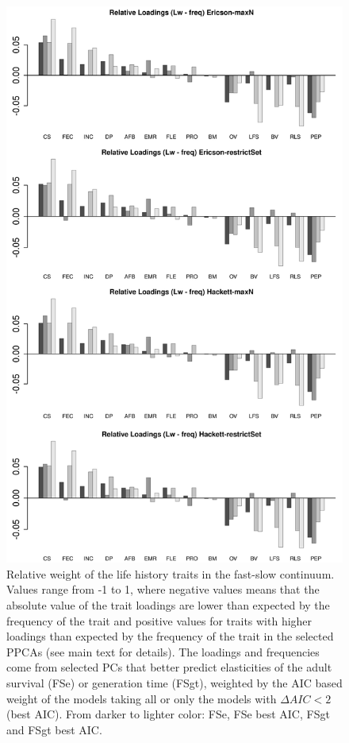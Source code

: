 \begin{figure}[ht!]
\centering
\includegraphics[width=.8\textwidth]{./Figures/Appendix2_1/FS relWeights plots-ALL.png}
\caption[LHT relative importance of the FS axes]{
Relative weight of the life history traits in the fast-slow continuum. Values
range from -1 to 1, where negative values means that the absolute value of the
trait loadings are lower than expected by the frequency of the trait and
positive values for traits with higher loadings than expected by the frequency
of the trait in the selected PPCAs (see main text for details). The loadings and
frequencies come from selected PCs that better predict elasticities of the
adult survival (FSe) or generation time (FSgt), weighted by the AIC based weight
of the models taking all or only the models with $\Delta AIC < 2$ (best AIC).
From darker to lighter color: FSe, FSe best AIC, FSgt and FSgt best AIC.}
\label{fig:figApp2.1.2}
\end{figure}

